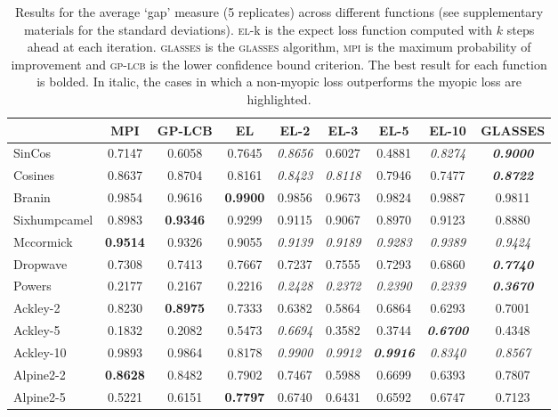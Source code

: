 \documentclass[twoside]{article}
\newcommand{\acr}[1]{\textsc{#1}\xspace}
\newcommand{\us}{\acr{glasses}}
\newcommand{\mpi}{\acr{mpi}}
\newcommand{\el}{\acr{el}}
\newcommand{\lcb}{\acr{gp-lcb}}
\begin{document}
\begin{table}[t!]
\begin{center}
\begin{tabular}{lcccccccc}
\toprule
{} &     MPI &     GP-LCB &      EL &    EL-2 &    EL-3 &    EL-5 &  EL-10 &    GLASSES \\
\midrule
SinCos  &  0.7147 &  0.6058 &  0.7645 &  \emph{0.8656} &  0.6027 &  0.4881 &  \emph{0.8274} &  \emph{\textbf{0.9000}} \\ 
Cosines           &  0.8637 &  0.8704 &  0.8161 &  \emph{0.8423} &  \emph{0.8118} &  0.7946 &  0.7477 &  \emph{\textbf{0.8722}} \\
Branin              &  0.9854 &  0.9616 &  \textbf{0.9900} &  0.9856 &  0.9673 &  0.9824 &  0.9887 &  0.9811 \\
Sixhumpcamel        &  0.8983 &  \textbf{0.9346} &  0.9299 &  0.9115 &  0.9067 &  0.8970 &  0.9123 &  0.8880 \\
Mccormick           & \textbf{0.9514} &  0.9326 &  0.9055 &  \emph{0.9139} &  \emph{0.9189} &  \emph{0.9283} &  \emph{0.9389} &  \emph{0.9424} \\
Dropwave            &  0.7308 &  0.7413 &  0.7667 &  0.7237 &  0.7555 &  0.7293 &  0.6860 &  \emph{\textbf{0.7740}} \\
Powers              &  0.2177 &  0.2167 &  0.2216 &  \emph{0.2428} &  \emph{0.2372} &  \emph{0.2390} &  \emph{0.2339} &  \emph{\textbf{0.3670}} \\
Ackley-2 &  0.8230 &  \textbf{0.8975} &  0.7333 &  0.6382 &  0.5864 &  0.6864 &  0.6293 &  0.7001 \\
Ackley-5  & 0.1832&   0.2082&   0.5473&   \emph{0.6694}&  0.3582&   0.3744&   \emph{\textbf{0.6700}} &  0.4348\\ 
Ackley-10 &  0.9893 &  0.9864 &  0.8178 &   \emph{0.9900} &   \emph{0.9912} &   \emph{\textbf{0.9916}} &   \emph{0.8340} &   \emph{0.8567} \\
Alpine2-2 &  \textbf{0.8628} &  0.8482 &  0.7902 &  0.7467 &  0.5988 &  0.6699 &  0.6393 &  0.7807 \\
Alpine2-5  &  0.5221 &  0.6151 &  \textbf{0.7797} &  0.6740 &  0.6431 &  0.6592 &  0.6747 &  0.7123 \\
\bottomrule
\end{tabular}\caption{Results for the average `gap' measure (5 replicates) across different functions (see supplementary materials for the standard deviations).  \el-k is the expect loss function computed with $k$ steps ahead at each iteration. \us is the \us algorithm, \mpi is the maximum probability of improvement and \lcb is the lower confidence bound criterion. The best result for each function is bolded. In italic, the cases in which a non-myopic loss outperforms the myopic  loss are highlighted.}\label{table:comparision}
\end{center}
\end{table}
\end{document}
